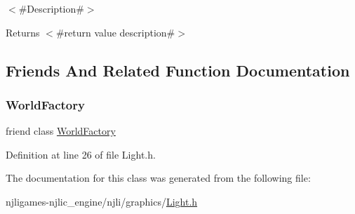 $<$\#\+Description\#$>$

\begin{DoxyReturn}{Returns}
$<$\#return value description\#$>$ 
\end{DoxyReturn}


\subsection{Friends And Related Function Documentation}
\mbox{\label{classnjli_1_1_light_acb96ebb09abe8f2a37a915a842babfac}} 
\subsubsection{\texorpdfstring{World\+Factory}{WorldFactory}}
{\footnotesize\ttfamily friend class \mbox{\hyperlink{classnjli_1_1_world_factory}{World\+Factory}}\hspace{0.3cm}{\ttfamily [friend]}}



Definition at line 26 of file Light.\+h.



The documentation for this class was generated from the following file\+:\begin{DoxyCompactItemize}
\item 
njligames-\/njlic\+\_\+engine/njli/graphics/\mbox{\hyperlink{_light_8h}{Light.\+h}}\end{DoxyCompactItemize}
